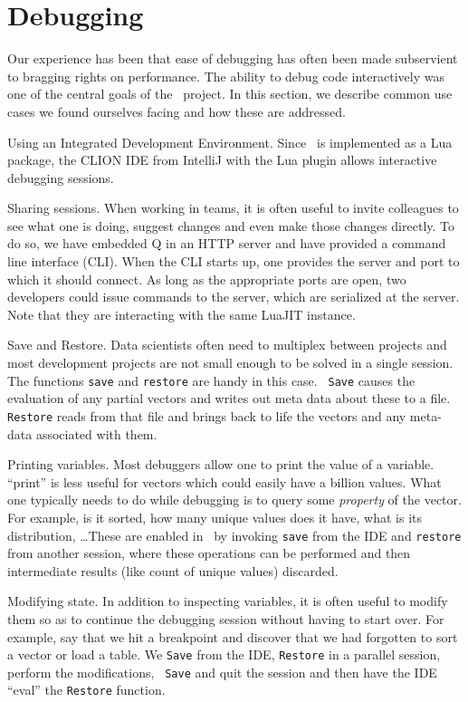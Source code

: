 \section{Debugging}
\label{Debugging}

Our experience has been that ease of debugging has often been made
subservient to bragging rights on performance. The ability to debug code
interactively was one of the central goals of the \Q\ project. In this section,
we describe common use cases we found ourselves facing and how these are
addressed.

\be
\item Using an Integrated Development Environment.
Since \Q\ is implemented as a Lua package, the CLION IDE from IntelliJ 
with the Lua plugin allows interactive debugging sessions. 
\item Sharing sessions. When working in teams, it is often useful to invite
colleagues to see what one is doing, suggest changes and even make those changes
directly. To do so, we have embedded Q in an HTTP server and have provided a command
line interface (CLI). When the CLI starts up, one provides the server and port
to which it should connect. As long as the appropriate ports are open, two
developers could issue commands to the server, which are serialized at the
server. Note that they are interacting with the same LuaJIT instance.
\item Save and Restore. Data scientists often need to multiplex between projects
and most development projects are not small enough to be solved in a single
session. The functions {\tt save} and {\tt restore} are handy in this case. {\tt
Save}
causes the evaluation of any partial vectors and writes out meta data about
these to a file. {\tt Restore} reads from that file and brings back to life the
vectors and any meta-data associated with them.

\item Printing variables. Most debuggers allow one to print the value of a
variable. ``print'' is less useful for vectors 
which could easily have a billion values. What one typically needs to do
while debugging is to query some {\it property} of the vector. For example, is it
sorted, how many unique values does it have, what is its distribution,
\ldots These are enabled in \Q\ by invoking {\tt save} from the IDE and
{\tt restore} from another session, where these operations can be performed and
then intermediate results (like count of unique values) discarded.

\item Modifying state. In addition to inspecting variables, it is often useful
  to modify them so as to continue the debugging session without having to
  start over. For example, say that we hit a breakpoint and discover  
  that we had forgotten to sort a vector or load a table. We {\tt Save} from the
  IDE, {\tt Restore} in a parallel session, perform the modifications, {\tt
  Save} and quit the session and then have the IDE ``eval'' the {\tt Restore}
  function.

\ee
